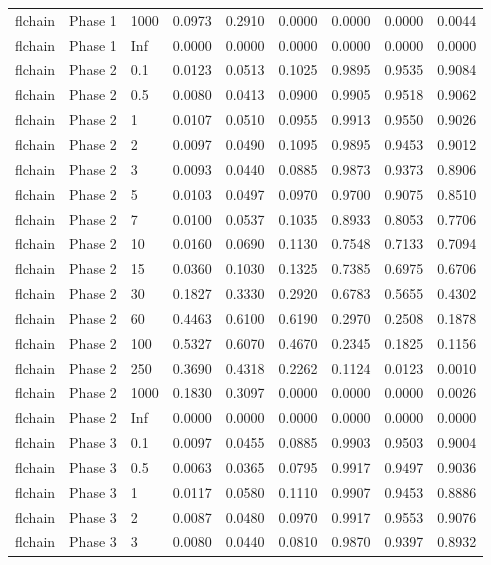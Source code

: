 \begin{tabular}{lllllllll}
  flchain & Phase 1 & 1000 & 0.0973 & 0.2910 & 0.0000 & 0.0000 & 0.0000 & 0.0044 \\ 
  flchain & Phase 1 & Inf & 0.0000 & 0.0000 & 0.0000 & 0.0000 & 0.0000 & 0.0000 \\ 
  flchain & Phase 2 & 0.1 & 0.0123 & 0.0513 & 0.1025 & 0.9895 & 0.9535 & 0.9084 \\ 
  flchain & Phase 2 & 0.5 & 0.0080 & 0.0413 & 0.0900 & 0.9905 & 0.9518 & 0.9062 \\ 
  flchain & Phase 2 & 1 & 0.0107 & 0.0510 & 0.0955 & 0.9913 & 0.9550 & 0.9026 \\ 
  flchain & Phase 2 & 2 & 0.0097 & 0.0490 & 0.1095 & 0.9895 & 0.9453 & 0.9012 \\ 
  flchain & Phase 2 & 3 & 0.0093 & 0.0440 & 0.0885 & 0.9873 & 0.9373 & 0.8906 \\ 
  flchain & Phase 2 & 5 & 0.0103 & 0.0497 & 0.0970 & 0.9700 & 0.9075 & 0.8510 \\ 
  flchain & Phase 2 & 7 & 0.0100 & 0.0537 & 0.1035 & 0.8933 & 0.8053 & 0.7706 \\ 
  flchain & Phase 2 & 10 & 0.0160 & 0.0690 & 0.1130 & 0.7548 & 0.7133 & 0.7094 \\ 
  flchain & Phase 2 & 15 & 0.0360 & 0.1030 & 0.1325 & 0.7385 & 0.6975 & 0.6706 \\ 
  flchain & Phase 2 & 30 & 0.1827 & 0.3330 & 0.2920 & 0.6783 & 0.5655 & 0.4302 \\ 
  flchain & Phase 2 & 60 & 0.4463 & 0.6100 & 0.6190 & 0.2970 & 0.2508 & 0.1878 \\ 
  flchain & Phase 2 & 100 & 0.5327 & 0.6070 & 0.4670 & 0.2345 & 0.1825 & 0.1156 \\ 
  flchain & Phase 2 & 250 & 0.3690 & 0.4318 & 0.2262 & 0.1124 & 0.0123 & 0.0010 \\ 
  flchain & Phase 2 & 1000 & 0.1830 & 0.3097 & 0.0000 & 0.0000 & 0.0000 & 0.0026 \\ 
  flchain & Phase 2 & Inf & 0.0000 & 0.0000 & 0.0000 & 0.0000 & 0.0000 & 0.0000 \\ 
  flchain & Phase 3 & 0.1 & 0.0097 & 0.0455 & 0.0885 & 0.9903 & 0.9503 & 0.9004 \\ 
  flchain & Phase 3 & 0.5 & 0.0063 & 0.0365 & 0.0795 & 0.9917 & 0.9497 & 0.9036 \\ 
  flchain & Phase 3 & 1 & 0.0117 & 0.0580 & 0.1110 & 0.9907 & 0.9453 & 0.8886 \\ 
  flchain & Phase 3 & 2 & 0.0087 & 0.0480 & 0.0970 & 0.9917 & 0.9553 & 0.9076 \\ 
  flchain & Phase 3 & 3 & 0.0080 & 0.0440 & 0.0810 & 0.9870 & 0.9397 & 0.8932 \\ 

\end{tabular}
